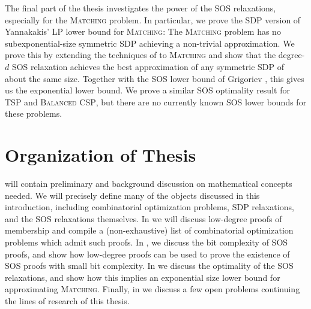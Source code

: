 The final part of the thesis investigates the power of the SOS relaxations, especially for the \textsc{Matching} problem. In particular, we prove the SDP version of Yannakakis' LP lower bound for \textsc{Matching}: The \textsc{Matching} problem has no subexponential-size symmetric SDP achieving a non-trivial approximation. We prove this by extending the techniques of \cite{LRST14} to \textsc{Matching} and show that the degree-$d$ SOS relaxation achieves the best approximation of any symmetric SDP  
of about the same size. Together with the SOS lower bound of Grigoriev \cite{Gri01}, this gives us the exponential lower bound. We prove a similar SOS optimality result for \textsc{TSP} and \textsc{Balanced CSP}, but there are no currently known SOS lower bounds for these problems. 

\section{Organization of Thesis}

 will contain preliminary and background discussion on mathematical concepts needed. We will precisely define many of the objects discussed in this introduction, including combinatorial optimization problems, SDP relaxations, and the SOS relaxations themselves. In  we will discuss low-degree proofs of membership and compile a (non-exhaustive) list of combinatorial optimization problems which admit such proofs. In , we discuss the bit complexity of SOS proofs, and show how low-degree proofs can be used to prove the existence of SOS proofs with small bit complexity. In  we discuss the optimality of the SOS relaxations, and show how this implies an exponential size lower bound for approximating \textsc{Matching}. Finally, in  we discuss a few open problems continuing the lines of research of this thesis.



